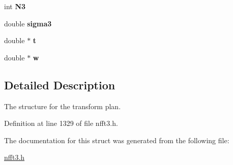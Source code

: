 \begin{CompactItemize}
\item 
\hypertarget{structmri__inh__3d__plan_o5}{
int {\bf N3}}
\label{structmri__inh__3d__plan_o5}

\item 
\hypertarget{structmri__inh__3d__plan_o6}{
double {\bf sigma3}}
\label{structmri__inh__3d__plan_o6}

\item 
\hypertarget{structmri__inh__3d__plan_o7}{
double $\ast$ {\bf t}}
\label{structmri__inh__3d__plan_o7}

\item 
\hypertarget{structmri__inh__3d__plan_o8}{
double $\ast$ {\bf w}}
\label{structmri__inh__3d__plan_o8}

\end{CompactItemize}


\subsection{Detailed Description}
The structure for the transform plan. 



Definition at line 1329 of file nfft3.h.

The documentation for this struct was generated from the following file:\begin{CompactItemize}
\item 
\hyperlink{nfft3_8h}{nfft3.h}\end{CompactItemize}
